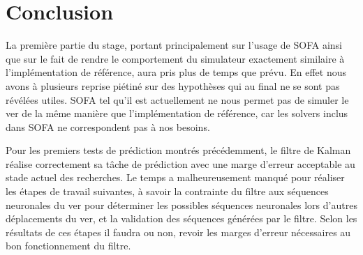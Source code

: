 \chapter{Conclusion} %
\label{cha:Conclusion}

La première partie du stage, portant principalement sur l'usage de
SOFA ainsi que sur le fait de rendre le comportement du simulateur exactement similaire à
l'implémentation de référence, aura pris plus de temps que prévu. En effet
nous avons à plusieurs reprise piétiné sur des hypothèses qui au final ne se sont pas
révélées utiles. SOFA tel qu'il est actuellement ne nous permet pas de simuler
le ver de la même manière que l'implémentation de référence, car les solvers inclus dans SOFA ne correspondent pas
à nos besoins. 

Pour les premiers tests de prédiction montrés précédemment, le filtre de Kalman
réalise correctement sa tâche de prédiction avec une marge d'erreur acceptable
au stade actuel des recherches. Le temps a malheureusement manqué pour réaliser
les étapes de travail suivantes, à savoir la contrainte du filtre aux séquences
neuronales du ver pour déterminer les possibles séquences neuronales lors d'autres
déplacements du ver, et la validation des séquences générées par le filtre.
Selon les résultats de ces étapes il faudra ou non, revoir les marges d'erreur
nécessaires au bon fonctionnement du filtre.

